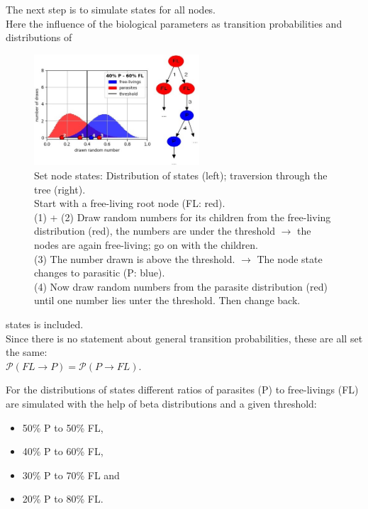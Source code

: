     The next step is to simulate states for all nodes. \\
    Here the influence of the biological parameters as transition probabilities and distributions of
      \begin{figure}
        \centering
        \includegraphics[width=0.55\textwidth]{Figures/40-60_all.jpg}
        \caption{Set node states: Distribution of states (left); traversion through the tree (right). \\
          Start with a free-living root node (FL: red). \\
          (1) + (2) Draw random numbers for its children from the free-living distribution (red), the numbers are under the threshold 
          $\rightarrow$ the nodes are again free-living; go on with the children. \\
          (3) The number drawn is above the threshold. $\rightarrow$ The node state changes to parasitic (P: blue). \\
          (4) Now draw random numbers from the parasite distribution (red) until one number lies unter the threshold. Then change back.}
        \label{fig:set node states}
      \end{figure} 
      states is included. \\
    Since there is no statement about general transition probabilities, these are all set the same: \\
    $\mathcal{P}(FL \rightarrow P) = \mathcal{P}(P \rightarrow FL)$.

    For the distributions of states different ratios of parasites (P) to free-livings (FL) are 
      simulated with the help of beta distributions and a given threshold:
      \begin{itemize}
        \item 50\% P to 50\% FL,
        \item 40\% P to 60\% FL,
        \item 30\% P to 70\% FL and 
        \item 20\% P to 80\% FL.
      \end{itemize}

